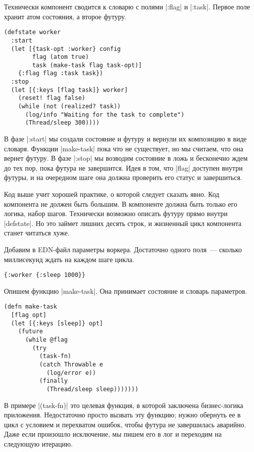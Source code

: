Технически компонент сводится к словарю с полями \spverb|:flag| и \spverb|:task|. Первое поле
хранит атом состояния, а второе футуру.

\begin{verbatim}
(defstate worker
  :start
  (let [{task-opt :worker} config
        flag (atom true)
        task (make-task flag task-opt)]
    {:flag flag :task task})
  :stop
  (let [{:keys [flag task]} worker]
    (reset! flag false)
    (while (not (realized? task))
      (log/info "Waiting for the task to complete")
      (Thread/sleep 300))))
\end{verbatim}

В фазе \spverb|:start| мы создали состояние и футуру и вернули их композицию в виде
словаря. Функции \spverb|make-task| пока что не существует, но мы считаем, что она
вернет футуру. В фазе \spverb|:stop| мы возводим состояние в ложь и бесконечно ждем до
тех пор, пока футура не завершится. Идея в том, что \spverb|flag| доступен внутри
футуры, и на очередном шаге она должна проверить его статус и завершиться.

Код выше учит хорошей практике, о которой следует сказать явно. Код компонента
не должен быть большим. В компоненте должна быть только его логика, набор
шагов. Технически возможно описать футуру прямо внутри \spverb|defstate|. Но это займет
лишних десять строк, и жизненный цикл компонента станет читаться хуже.

Добавим в EDN-файл параметры воркера. Достаточно одного поля~--- сколько
миллисекунд ждать на каждом шаге цикла.

\begin{verbatim}
{:worker {:sleep 1000}}
\end{verbatim}

Опишем функцию \spverb|make-task|. Она принимает состояние и словарь параметров.

\begin{verbatim}
(defn make-task
  [flag opt]
  (let [{:keys [sleep]} opt]
    (future
      (while @flag
        (try
          (task-fn)
          (catch Throwable e
            (log/error e))
          (finally
            (Thread/sleep sleep)))))))
\end{verbatim}

В примере \spverb|(task-fn)| это целевая функция, в которой заключена бизнес-логика
приложения. Недостаточно просто вызвать эту функцию; нужно обернуть ее в цикл с
условием и перехватом ошибок, чтобы футура не завершилась аварийно. Даже если
произошло исключение, мы пишем его в лог и переходим на следующую итерацию.


